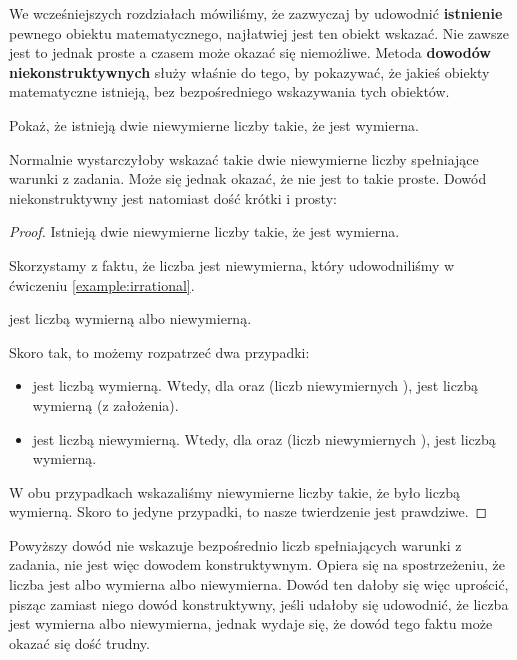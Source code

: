 We wcześniejszych rozdziałach mówiliśmy, że zazwyczaj by udowodnić \textbf{istnienie} pewnego obiektu matematycznego, najłatwiej jest ten obiekt wskazać. Nie zawsze jest to jednak proste a czasem może okazać się niemożliwe. Metoda \textbf{dowodów niekonstruktywnych} służy właśnie do tego, by pokazywać, że jakieś obiekty matematyczne istnieją, bez bezpośredniego wskazywania tych obiektów. 

\begin{example}
Pokaż, że istnieją dwie niewymierne liczby  takie, że  jest wymierna.
\end{example}

Normalnie wystarczyłoby wskazać takie dwie niewymierne liczby spełniające warunki z zadania. Może się jednak okazać, że nie jest to takie proste. Dowód niekonstruktywny jest natomiast dość krótki i prosty:

\begin{proof}
Istnieją dwie niewymierne liczby  takie, że  jest wymierna.

Skorzystamy z faktu, że liczba  jest niewymierna, który udowodniliśmy w ćwiczeniu \ref{example:irrational}.

\begin{fact}
 jest liczbą wymierną albo niewymierną.
\end{fact}

Skoro tak, to możemy rozpatrzeć dwa przypadki:

\begin{itemize}
    \item {} jest liczbą wymierną. Wtedy, dla  oraz  (liczb niewymiernych ),  jest liczbą wymierną (z założenia).
    
    \item {} jest liczbą niewymierną. Wtedy, dla  oraz  (liczb niewymiernych ),  jest liczbą wymierną.
\end{itemize}

W obu przypadkach wskazaliśmy niewymierne liczby  takie, że  było liczbą wymierną. Skoro to jedyne przypadki, to nasze twierdzenie jest prawdziwe. 
\end{proof}

Powyższy dowód nie wskazuje bezpośrednio liczb  spełniających warunki z zadania, nie jest więc dowodem konstruktywnym. Opiera się na spostrzeżeniu, że liczba  jest albo wymierna albo niewymierna. Dowód ten dałoby się więc uprościć, pisząc zamiast niego dowód konstruktywny, jeśli udałoby się udowodnić, że liczba  jest wymierna albo niewymierna, jednak wydaje się, że dowód tego faktu może okazać się dość trudny.